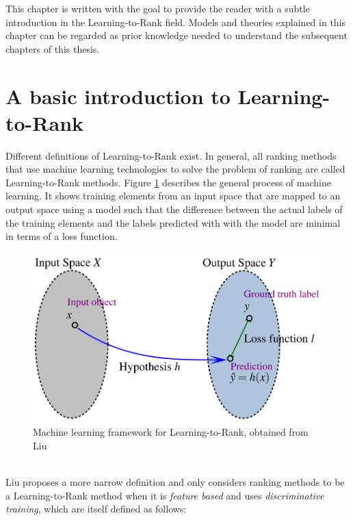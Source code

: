 This chapter is written with the goal to provide the reader with a subtle introduction in the Learning-to-Rank field. Models and theories explained in this chapter can be regarded as prior knowledge needed to understand the subsequent chapters of this thesis.
\section{A basic introduction to Learning-to-Rank}
Different definitions of Learning-to-Rank exist. In general, all ranking methods that use machine learning technologies to solve the problem of ranking are called Learning-to-Rank methods. Figure \ref{fig:discriminative_training} describes the general process of machine learning. It shows training elements from an input space that are mapped to an output space using a model such that the difference between the actual labels of the training elements and the labels predicted with with the model are minimal in terms of a loss function.
\begin{figure}[!h]
\includegraphics[scale=0.26]{gfx/descriminative_training}
\caption{Machine learning framework for Learning-to-Rank, obtained from Liu \cite{Liu2007}}
\label{fig:discriminative_training}
\end{figure}\\
Liu \cite{Liu2007} proposes a more narrow definition and only considers ranking methods to be a Learning-to-Rank method when it is \emph{feature based} and uses \emph{discriminative training}, which are itself defined as follows:
